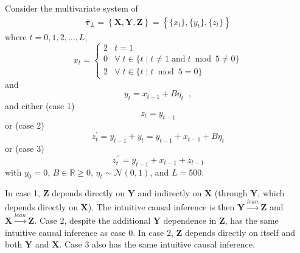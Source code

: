 \documentclass[twocolumn,aps,pre,groupedaddress]{revtex4-1}
\begin{document}
Consider the multivariate system of
\begin{eqnarray}
\label{eqn:3var}
\bar{\mathbf{\tau}}_L = \left\{\mathbf{X},\mathbf{Y},\mathbf{Z}\right\} = \left\{\{x_t\},\{y_t\},\{z_t\}\right\}
\end{eqnarray}
where $t=0,1,2,\ldots,L$,
\begin{equation*}
x_t = \left\{
  \begin{array}{lr}
    2 & t = 1\\
    0 & \forall\; t\in\{t\;|\;t\neq 1 \;\mathrm{and}\; t\bmod 5 \neq 0\}\\
    2 & \forall\; t\in\{t\;|\;t\bmod 5 = 0\}
  \end{array}
\right.
\end{equation*}
and
\begin{equation*}
y_t = x_{t-1} + B\eta_t\;\;,
\end{equation*}
and either (case 1)
\begin{equation}
z_t = y_{t-1}
\end{equation}
or (case 2)
\begin{equation}
z_t^\prime = y_{t-1} + y_t = y_{t-1} + x_{t-1} + B\eta_t
\end{equation}
or (case 3)
\begin{equation}
z_t^{\prime\prime} = y_{t-1} + x_{t-1} + z_{t-1}
\end{equation}
with $y_0 = 0$, $B\in\mathbb{R}\ge 0$, $\eta_t\sim\mathcal{N}\left(0,1\right)$, and $L=500$.

In case 1, $\mathbf{Z}$ depends directly on $\mathbf{Y}$ and indirectly on $\mathbf{X}$ (through $\mathbf{Y}$, which depends directly on $\mathbf{X}$).  The intuitive causal inference is then $\mathbf{Y}\xrightarrow{lean}\mathbf{Z}$ and $\mathbf{X}\xrightarrow{lean}\mathbf{Z}$.  Case 2, despite the additional $\mathbf{Y}$ dependence in $\mathbf{Z}$, has the same intuitive causal inference as case 0.  In case 2, $\mathbf{Z}$ depends directly on itself and both $\mathbf{Y}$ and $\mathbf{X}$.  Case 3 also has the same intuitive causal inference.
\end{document}
